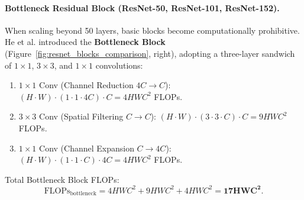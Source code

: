 \paragraph{Bottleneck Residual Block (ResNet-50, ResNet-101, ResNet-152).}
When scaling beyond 50 layers, basic blocks become computationally prohibitive. He et al. introduced the \textbf{Bottleneck Block} (Figure~\ref{fig:resnet_blocks_comparison}, right), adopting a three-layer sandwich of $1 \times 1$, $3 \times 3$, and $1 \times 1$ convolutions:
\begin{enumerate}[noitemsep]
  \item $1 \times 1$ Conv (Channel Reduction $4C \to C$): $(H \cdot W) \cdot (1 \cdot 1 \cdot 4C) \cdot C = 4 H W C^2$ FLOPs.
  \item $3 \times 3$ Conv (Spatial Filtering $C \to C$): $(H \cdot W) \cdot (3 \cdot 3 \cdot C) \cdot C = 9 H W C^2$ FLOPs.
  \item $1 \times 1$ Conv (Channel Expansion $C \to 4C$): $(H \cdot W) \cdot (1 \cdot 1 \cdot C) \cdot 4C = 4 H W C^2$ FLOPs.
\end{enumerate}
Total Bottleneck Block FLOPs:
\begin{equation}
\text{FLOPs}_{\text{bottleneck}} = 4 H W C^2 + 9 H W C^2 + 4 H W C^2 = \mathbf{17 H W C^2}.
\end{equation}

